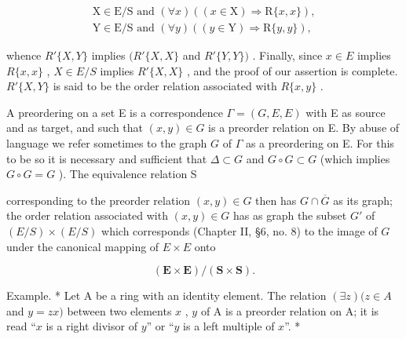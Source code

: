 \[
\begin{array}{l} \mathrm{X} \in \mathrm{E} / \mathrm{S} \text { and } (\forall x) ((x \in \mathrm{X}) \Longrightarrow \mathrm{R} \{x, x \}), \\ \mathrm{Y} \in \mathrm{E} / \mathrm{S} \text { and } (\forall y) ((y \in \mathrm{Y}) \Longrightarrow \mathrm{R} \{y, y \}), \end{array}
\]

whence \(R'\{X,Y\}\) implies \((R'\{X,X\}\) and \(R'\{Y,Y\})\) . Finally, since \(x \in E\) implies \(R\{x,x\}\) , \(X \in E/S\) implies \(R'\{X,X\}\) , and the proof of our assertion is complete. \(R'\{X,Y\}\) is said to be the order relation associated with \(R\{x,y\}\) .

A preordering on a set E is a correspondence \(\Gamma = (G, E, E)\) with E as source and as target, and such that \((x, y) \in G\) is a preorder relation on E. By abuse of language we refer sometimes to the graph \(G\) of \(\Gamma\) as a preordering on E. For this to be so it is necessary and sufficient that \(\Delta \subset G\) and \(G \circ G \subset G\) (which implies \(G \circ G = G\) ). The equivalence relation S

corresponding to the preorder relation \((x, y) \in G\) then has \(G \cap \overline{G}\) as its graph; the order relation associated with \((x, y) \in G\) has as graph the subset \(G'\) of \((E/S) \times (E/S)\) which corresponds (Chapter II, §6, no. 8) to the image of \(G\) under the canonical mapping of \(E \times E\) onto

\[
(\mathbf {E} \times \mathbf {E}) / (\mathbf {S} \times \mathbf {S}).
\]

Example. * Let A be a ring with an identity element. The relation \((\exists z)(z \in A\) and \(y = zx)\) between two elements \(x\) , \(y\) of A is a preorder relation on A; it is read ``\(x\) is a right divisor of \(y\)'' or ``\(y\) is a left multiple of \(x\)''. *

